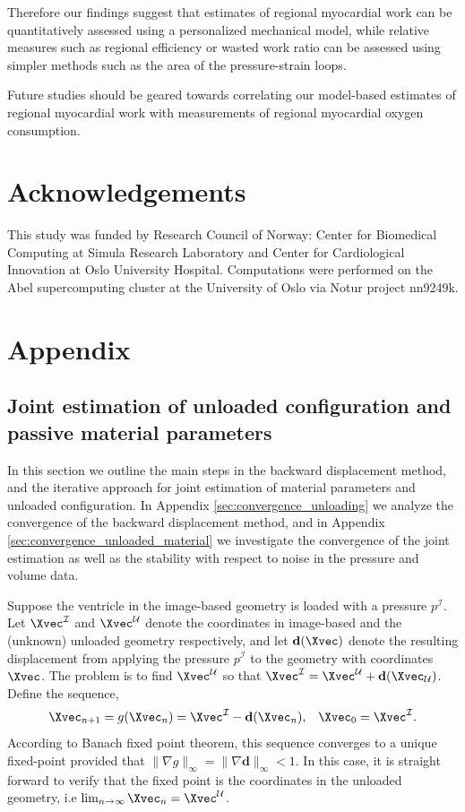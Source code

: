 Therefore our findings suggest that estimates of regional myocardial
work can be quantitatively assessed using a personalized mechanical
model, while relative measures such as regional efficiency or wasted
work ratio can be assessed using simpler methods such as the area of
the pressure-strain loops.  

Future studies should be geared towards correlating our model-based
estimates of regional myocardial work with measurements of regional
myocardial oxygen consumption. 



\section*{Acknowledgements}
This study was funded by Research Council of Norway: Center
for Biomedical Computing at Simula Research Laboratory and Center
for Cardiological Innovation at Oslo University Hospital.
Computations were performed on the Abel supercomputing cluster at
the University of Oslo via Notur project nn9249k. 


\clearpage

\appendix
\section{Appendix}
\subsection{Joint estimation of unloaded
  configuration and passive material parameters}
\label{sec:unloading}
In this section we outline the main steps in the backward displacement
method, and the iterative approach for joint estimation of material
parameters and unloaded configuration. In Appendix
\ref{sec:convergence_unloading} we analyze the convergence of the
backward displacement method, and in Appendix
\ref{sec:convergence_unloaded_material} we investigate the convergence
of the joint estimation as well as the stability with respect to noise
in the pressure and volume data. 

Suppose the ventricle in the image-based geometry is loaded with
a pressure $p^{\mathcal{I}}$.  Let
$\Xvec^{\mathcal{I}}$ and $\Xvec^{\mathcal{U}}$ denote the coordinates
in image-based and the (unknown) unloaded geometry respectively, and
let $\mathbf{d}(\Xvec)$ denote the resulting displacement from applying the
pressure $p^{\mathcal{I}}$ to the geometry with coordinates
$\Xvec$. The problem is to find $\Xvec^{\mathcal{U}}$ so that
$\Xvec^{\mathcal{I}} = \Xvec^{\mathcal{U}} +
\mathbf{d}(\Xvec_{\mathcal{U}})$. Define the sequence,   
\begin{align}
  \Xvec_{n+1} = g(\Xvec_n) =  \Xvec^{\mathcal{I}} - \mathbf{d}(\Xvec_n),
  && \Xvec_0 = \Xvec^{\mathcal{I}}.
    \label{eq:backward_displacement_method}
\end{align}
According to Banach fixed point theorem, this sequence converges to a
unique fixed-point provided that $\| \nabla g \|_{\infty} = \| \nabla \mathbf{d}
\|_{\infty} < 1$. In this case, it is straight forward to verify that
the fixed point is the coordinates in the unloaded geometry, i.e
$\lim_{n \rightarrow \infty} \Xvec_n = \Xvec^{\mathcal{U}}$.



